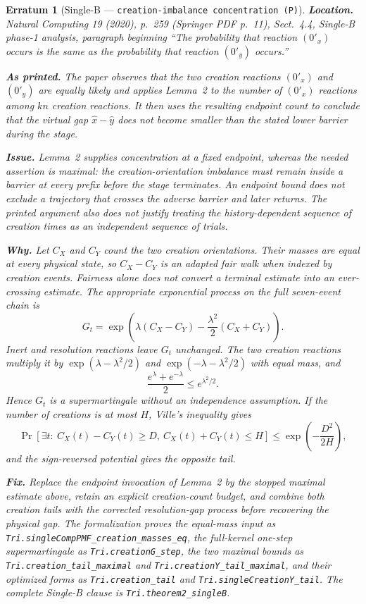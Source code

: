 \documentclass[11pt]{article}
\theoremstyle{erratumstyle}
\newtheorem{erratum}{Erratum}
\begin{document}
\begin{erratum}[Single-B --- \texttt{creation-imbalance concentration (P)}]
\textbf{Location.} \emph{Natural Computing} 19 (2020), p.~259
(Springer PDF p.~11), Sect.~4.4, Single-B phase-1 analysis, paragraph beginning
``The probability that reaction $(0'_x)$ occurs is the same as the probability
that reaction $(0'_y)$ occurs.''

\medskip
\textbf{As printed.} The paper observes that the two creation reactions
$(0'_x)$ and $(0'_y)$ are equally likely and applies Lemma~2 to the number of
$(0'_x)$ reactions among $kn$ creation reactions. It then uses the resulting
endpoint count to conclude that the virtual gap $\hat x-\hat y$ does not
\emph{become} smaller than the stated lower barrier during the stage.

\medskip
\textbf{Issue.} Lemma~2 supplies concentration at a fixed endpoint, whereas the
needed assertion is maximal: the creation-orientation imbalance must remain
inside a barrier at every prefix before the stage terminates. An endpoint bound
does not exclude a trajectory that crosses the adverse barrier and later
returns. The printed argument also does not justify treating the
history-dependent sequence of creation times as an independent sequence of
trials.

\medskip
\textbf{Why.} Let $C_X$ and $C_Y$ count the two creation orientations. Their
masses are equal at every physical state, so $C_X-C_Y$ is an adapted fair walk
when indexed by creation events. Fairness alone does not convert a terminal
estimate into an ever-crossing estimate. The appropriate exponential process
on the full seven-event chain is
\[
  G_t=
  \exp\!\left(
    \lambda(C_X-C_Y)
    -\frac{\lambda^2}{2}(C_X+C_Y)
  \right).
\]
Inert and resolution reactions leave $G_t$ unchanged. The two creation
reactions multiply it by
$\exp(\lambda-\lambda^2/2)$ and
$\exp(-\lambda-\lambda^2/2)$ with equal mass, and
\[
  \frac{e^\lambda+e^{-\lambda}}2
  \le e^{\lambda^2/2}.
\]
Hence $G_t$ is a supermartingale without an independence assumption. If the
number of creations is at most $H$, Ville's inequality gives
\[
 \Pr\!\left[
   \exists t:\ C_X(t)-C_Y(t)\ge D,
   \ C_X(t)+C_Y(t)\le H
 \right]
 \le \exp\!\left(-\frac{D^2}{2H}\right),
\]
and the sign-reversed potential gives the opposite tail.

\medskip
\textbf{Fix.} Replace the endpoint invocation of Lemma~2 by the stopped
maximal estimate above, retain an explicit creation-count budget, and combine
both creation tails with the corrected resolution-gap process before
recovering the physical gap. The formalization proves the equal-mass input as
\texttt{Tri.singleCompPMF\_creation\_masses\_eq}, the full-kernel one-step
supermartingale as \texttt{Tri.creationG\_step}, the two maximal bounds as
\texttt{Tri.creation\_tail\_maximal} and
\texttt{Tri.creationY\_tail\_maximal}, and their optimized forms as
\texttt{Tri.creation\_tail} and \texttt{Tri.singleCreationY\_tail}. The
complete Single-B clause is \texttt{Tri.theorem2\_singleB}.
\end{erratum}
\end{document}
